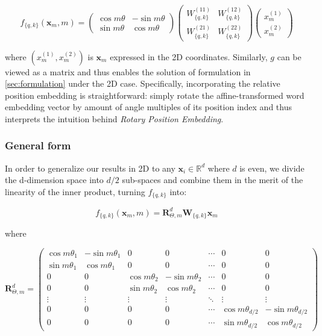 \begin{equation}
	f_{\{q, k\}}({\boldsymbol x}_m, m) = \left(
	\begin{array}{cc}
		\cos{m\theta}& -\sin{m\theta}  \\
		\sin{m\theta}&\cos{m\theta} 
	\end{array}
	\right)
	\left(
	\begin{array}{cc}
		W^{(11)}_{\{q, k\}} & W^{(12)}_{\{q, k\}} \\
		W^{(21)}_{\{q, k\}} & W^{(22)}_{\{q, k\}}
	\end{array}
	\right)
	\left(
	\begin{array}{cc}
		x^{(1)}_m\\
		x^{(2)}_m
	\end{array}
	\right)
\end{equation}

where $(x^{(1)}_m, x^{(2)}_m)$ is ${\boldsymbol x}_m$ expressed in the 2D coordinates. Similarly, $g$ can be viewed as a matrix  and thus enables the solution of formulation in \ref{sec:formulation} under the 2D case. Specifically, incorporating the relative position embedding is straightforward: simply rotate the affine-transformed word embedding vector by amount of angle multiples of its position index and thus interprets the intuition behind \textit{Rotary Position Embedding}. 

\subsubsection{General form}\label{subsec:general-form}
In order to generalize our results in 2D to any ${\boldsymbol x}_i \in \mathbb{R}^d$ where $d$ is even,  we divide the d-dimension space into $d/2$ sub-spaces and combine them in the merit of the linearity of the inner product, turning $f_{\{q, k\}}$ into:

\begin{equation}
	f_{\{q, k\}}({\boldsymbol x}_m, m) = {\boldsymbol R}^d_{\Theta, m}{\boldsymbol W}_{\{q, k\}}{\boldsymbol x}_m 
	\label{fn:rope-fqk}
\end{equation}

where

\begin{equation}    
	{\boldsymbol R}^d_{\Theta,m} = 
	\begin{pmatrix}
		\cos{m\theta_1}& -\sin{m\theta_1}&0&0&\cdots&0&0\\
		\sin{m\theta_1}&\cos{m\theta_1}&0&0&\cdots&0&0 \\
		0&0&\cos{m\theta_2}& -\sin{m\theta_2}&\cdots&0&0\\
		0&0&\sin{m\theta_2}&\cos{m\theta_2}&\cdots&0&0 \\
		\vdots&\vdots&\vdots&\vdots&\ddots&\vdots&\vdots\\
		0&0&0&0&\cdots&\cos{m\theta_{d/2}}& -\sin{m\theta_{d/2}}\\
		0&0&0&0&\cdots&\sin{m\theta_{d/2}}&\cos{m\theta_{d/2}}
	\end{pmatrix}
	\label{fn:rope-RMat}
\end{equation}

